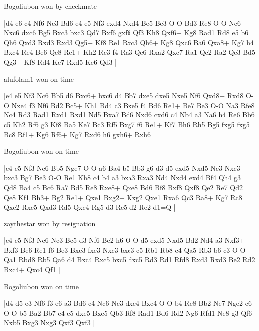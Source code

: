\showboard

Bogoliubon won by checkmate

\makegametitle
|d4 e6 c4 Nf6 Nc3 Bd6 e4 e5 Nf3 exd4 Nxd4 Be5 Be3 O-O Bd3 Re8 O-O Nc6 Nxc6 dxc6 Bg5 Bxc3 bxc3 Qd7 Bxf6 gxf6 Qf3 Kh8 Qxf6+ Kg8 Rad1 Rd8 e5 b6 Qh6 Qxd3 Rxd3 Rxd3 Qg5+ Kf8 Re1 Rxc3 Qh6+ Kg8 Qxc6 Ba6 Qxa8+ Kg7 h4 Bxc4 Re4 Be6 Qe8 Rc1+ Kh2 Rc3 f4 Ra3 Qc6 Rxa2 Qxc7 Ra1 Qc2 Ra2 Qc3 Bd5 Qg3+ Kf8 Rd4 Ke7 Rxd5 Ke6 Qd3  |

\showboard

alufolam1 won on time

\makegametitle
|e4 e5 Nf3 Nc6 Bb5 d6 Bxc6+ bxc6 d4 Bb7 dxe5 dxe5 Nxe5 Nf6 Qxd8+ Rxd8 O-O Nxe4 f3 Nf6 Bd2 Bc5+ Kh1 Bd4 c3 Bxe5 f4 Bd6 Re1+ Be7 Be3 O-O Na3 Rfe8 Nc4 Rd3 Rad1 Rxd1 Rxd1 Nd5 Bxa7 Bd6 Nxd6 cxd6 c4 Nb4 a3 Na6 h4 Re6 Bb6 c5 Kh2 Rf6 g3 Kf8 Ba5 Ke7 Bc3 Rf5 Bxg7 f6 Re1+ Kf7 Bh6 Rh5 Bg5 fxg5 fxg5 Bc8 Rf1+ Kg6 Rf6+ Kg7 Rxd6 h6 gxh6+ Rxh6  |

\showboard

Bogoliubon won on time

\makegametitle
|e4 e5 Nf3 Nc6 Bb5 Nge7 O-O a6 Ba4 b5 Bb3 g6 d3 d5 exd5 Nxd5 Nc3 Nxc3 bxc3 Bg7 Be3 O-O Re1 Kh8 c4 b4 a3 bxa3 Rxa3 Nd4 Nxd4 exd4 Bf4 Qh4 g3 Qd8 Ba4 c5 Bc6 Ra7 Bd5 Re8 Rxe8+ Qxe8 Bd6 Bf8 Bxf8 Qxf8 Qe2 Re7 Qd2 Qe8 Kf1 Bh3+ Bg2 Re1+ Qxe1 Bxg2+ Kxg2 Qxe1 Rxa6 Qc3 Ra8+ Kg7 Rc8 Qxc2 Rxc5 Qxd3 Rd5 Qxc4 Rg5 d3 Re5 d2 Re2 d1=Q  |

\showboard

zaythestar won by resignation

\makegametitle
|e4 e5 Nf3 Nc6 Nc3 Bc5 d3 Nf6 Be2 h6 O-O d5 exd5 Nxd5 Bd2 Nd4 a3 Nxf3+ Bxf3 Be6 Re1 f6 Be3 Bxe3 fxe3 Nxc3 bxc3 c5 Rb1 Rb8 c4 Qa5 Rb3 b6 c3 O-O Qa1 Rbd8 Rb5 Qa6 d4 Bxc4 Rxc5 bxc5 dxc5 Rd3 Rd1 Rfd8 Rxd3 Rxd3 Be2 Rd2 Bxc4+ Qxc4 Qf1  |

\showboard

Bogoliubon won on time

\makegametitle
|d4 d5 e3 Nf6 f3 e6 a3 Bd6 c4 Nc6 Nc3 dxc4 Bxc4 O-O b4 Re8 Bb2 Ne7 Nge2 c6 O-O b5 Ba2 Bb7 e4 e5 dxe5 Bxe5 Qb3 Rf8 Rad1 Bd6 Rd2 Ng6 Rfd1 Ne8 g3 Qf6 Nxb5 Bxg3 Nxg3 Qxf3 Qxf3  |

